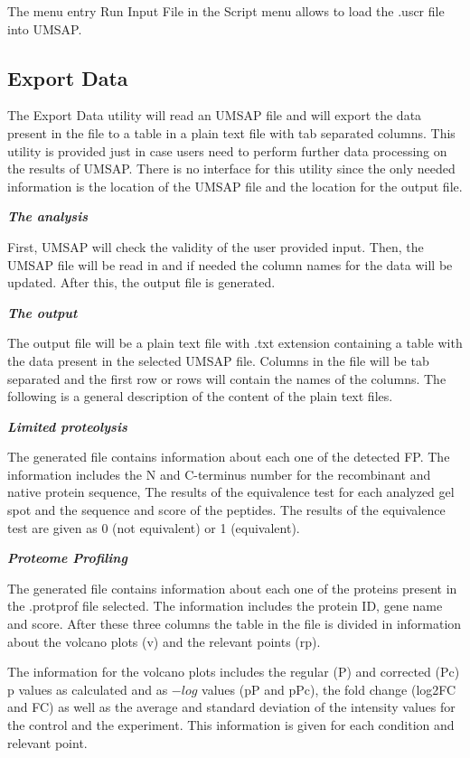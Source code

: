 The menu entry Run Input File in the Script menu allows to load the .uscr file into UMSAP.

\subsection{Export Data}
\label{subsec:utilExpData}

The Export Data utility will read an UMSAP file and will export the data present in the file to a table in a plain text file with tab separated columns. This utility is provided just in case users need to perform further data processing on the results of UMSAP. There is no interface for this utility since the only needed information is the location of the UMSAP file and the location for the output file.  

\textit{\textbf{The analysis}}

First, UMSAP will check the validity of the user provided input. Then, the UMSAP file will be read in and if needed the column names for the data will be updated. After this, the output file is generated.

\textit{\textbf{The output}}

The output file will be a plain text file with .txt extension containing a table with the data present in the selected UMSAP file. Columns in the file will be tab separated and the first row or rows will contain the names of the columns. The following is a general description of the content of the plain text files.

\textit{\textbf{Limited proteolysis}}

The generated file contains information about each one of the detected FP. The information includes the N and C-terminus number for the recombinant and native protein sequence, The results of the equivalence test for each analyzed gel spot and the sequence and score of the peptides. The results of the equivalence test are given as 0 (not equivalent) or 1 (equivalent).

\textit{\textbf{Proteome Profiling}}

The generated file contains information about each one of the proteins present in the .protprof file selected. The information includes the protein ID, gene name and score. After these three columns the table in the file is divided in information about the volcano plots (v) and the relevant points (rp).

The information for the volcano plots includes the regular (P) and corrected (Pc) p values as calculated and as $-log$ values (pP and pPc), the fold change (log2FC and FC) as well as the average and standard deviation of the intensity values for the control and the experiment. This information is given for each condition and relevant point.

